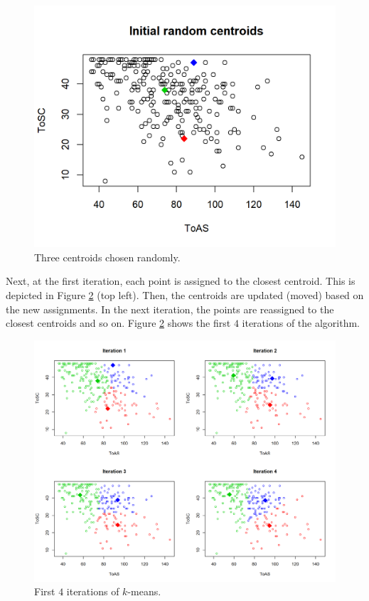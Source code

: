 \documentclass[
  11pt,
]{krantz}
\begin{document}
\begin{figure}

{\centering \includegraphics[width=0.9\linewidth]{images/clust_it0} 

}

\caption{Three centroids chosen randomly. }\label{fig:clustIt0}
\end{figure}

Next, at the first iteration, each point is assigned to the closest centroid. This is depicted in Figure \ref{fig:clustIts} (top left). Then, the centroids are updated (moved) based on the new assignments. In the next iteration, the points are reassigned to the closest centroids and so on. Figure \ref{fig:clustIts} shows the first \(4\) iterations of the algorithm.



\begin{figure}

{\centering \includegraphics[width=1\linewidth]{images/clust_its} 

}

\caption{First \(4\) iterations of \(k\)-means.}\label{fig:clustIts}
\end{figure}
\end{document}
